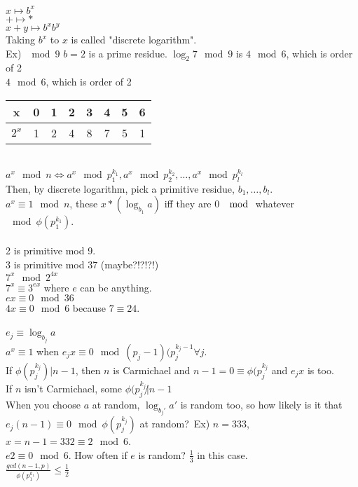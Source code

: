 \documentclass[13pt]{article}
\begin{document}
		$x \mapsto b^x$\\
		$+ \mapsto *$\\
		$x+y \mapsto b^xb^y$\\
		Taking $b^x$ to $x$ is called "discrete logarithm".\\
		Ex) $\mod 9$ $b=2$ is a prime residue.
		$\log_2 7 \mod 9$ is $4 \mod 6$, which is order of 2\\$4 \mod 6$, which is 
		order of 2\\
		\begin{tabular}{c | c c c c c c c }
			x & 0 & 1 & 2 & 3 & 4 & 5 & 6\\
			\hline
			$2^x$ & 1 & 2 & 4 & 8 & 7 & 5 & 1
		\end{tabular}\\
		$a^x \mod n \Leftrightarrow a^x \mod p_1^{k_1}, a^x \mod p_2^{k_2}, \ldots,
		a^x \mod p_l^{k_l}$\\
		Then, by discrete logarithm, pick a primitive residue, $b_1, \ldots, b_l$.\\
		$a^x \equiv 1 \mod n$, these $x*(\log_{b_1}a)$ iff they are 0 $\mod$ whatever 
		$\mod \phi(p_1^{k_1})$.\\\\
		2 is primitive mod 9.\\
		3 is primitive mod 37 (maybe?!?!?!)\\
		$7^x \mod 2^{4x}$\\
		$7^x \equiv 3^{ex}$ where $e$ can be anything.\\
		$ex \equiv 0 \mod 36$\\
		$4x \equiv 0 \mod 6$ because $7 \equiv 24$.\\\\
		$e_j \equiv \log_{b_j}a$\\
		$a^x \equiv 1$ when $e_jx \equiv 0 \mod (p_j - 1)(p_j^{k_j - 1} \forall j$.\\
		If $\phi(p_j^{k_j}) | n - 1$, then $n$ is Carmichael and $n-1 = 0 \equiv
		\phi(p_j^{k_j}$ and $e_j x$ is too.\\
		If $n$ isn't Carmichael, some $\phi(p_j^{k_j} \not| n -1$\\
		When you choose $a$ at random, $\log_{b_j'} a'$ is random too, so how
		likely is it that $e_j(n-1) \equiv 0 \mod \phi(p_j^{k_j})$ at random?\
		Ex) $n = 333$, $x = n-1 = 332 \equiv 2 \mod 6$.\\
		$e2 \equiv 0 \mod 6$. How often if $e$ is random? $\frac{1}{3}$ in this case.\\
		$\frac{gcd(n-1, p)}{\phi(p_1^{k_1})} \le \frac{1}{2}$
\end{document}
